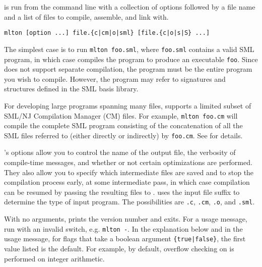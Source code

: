%
{\mlton} is run from the command line with a collection of options
followed by a file name and a list of files to compile, assemble, and
link with.
\begin{verbatim}
mlton [option ...] file.{c|cm|o|sml} [file.{c|o|s|S} ...]
\end{verbatim}
The simplest case is to run {\tt mlton foo.sml}, where {\tt foo.sml}
contains a valid SML program, in which case {\mlton} compiles the
program to produce an executable {\tt foo}.  Since {\mlton} does not
support separate compilation, the program must be the entire
program you wish to compile.  However, the program may refer to
signatures and structures defined in the SML basis library.

For developing large programs spanning many files, {\mlton} supports a
limited subset of SML/NJ Compilation Manager (CM) files.  For example,
{\tt mlton foo.cm} will compile the complete SML program consisting of
the concatenation of all the SML files referred to (either directly
or indirectly) by {\tt foo.cm}.  See  for details.
%

{\mlton}'s options allow you to control the name of the output file,
the verbosity of compile-time messages, and whether or not certain
optimizations are performed.  They also allow you to specify which
intermediate files are saved and to stop the compilation process
early, at some intermediate pass, in which case compilation can be
resumed by passing the resulting files to {\mlton}.  {\mlton} uses the
input file suffix to determine the type of input program.  The
possibilities are {\tt .c}, {\tt .cm}, {\tt .o}, and {\tt .sml}.

With no arguments, {\mlton} prints the version number and exits.  For
a usage message, run {\mlton} with an invalid switch, e.g. {\tt mlton
-}.  In the explanation below and in the usage message, for flags
that take a boolean argument {\tt \{true|false\}}, the first value
listed is the default.  For example, by default, overflow checking on
is performed on integer arithmetic.

\newcommand{\option}[1]{\item[{\tt #1}]\hspace{1em}\\}


